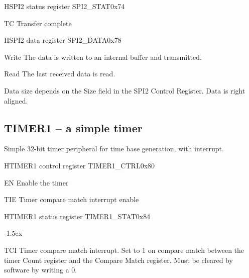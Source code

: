 \documentclass[12pt]{article}
\begin{document}
\begin{register}{H}{SPI2 status register SPI2\_STAT}{0x74}
\label{spi2stat}
%
%
\regnewline%
\end{register}
\begin{regdesc}[0.8\textwidth]\begin{reglist}[0000]
\item [TC] Transfer complete
\end{reglist}\end{regdesc}

\begin{register}{H}{SPI2 data register SPI2\_DATA}{0x78}
\label{spi2data}
\regnewline%
\end{register}
\begin{regdesc}[0.8\textwidth]\begin{reglist}[000000000]
\item[Write] The data is written to an internal buffer and transmitted.
\item[Read] The last received data is read.
\end{reglist}\end{regdesc}
Data size depends on the Size field in the SPI2 Control Register. Data is right aligned.


\subsection{TIMER1 -- a simple timer}
Simple 32-bit timer peripheral for time base generation, with interrupt.

\begin{register}{H}{TIMER1 control register TIMER1\_CTRL}{0x80}
\label{timer1ctrl}
%
%
%
\regnewline%
\end{register}
\begin{regdesc}[0.8\textwidth]\begin{reglist}[0000]
\item[EN] Enable the timer
\item[TIE] Timer compare match interrupt enable
\end{reglist}\end{regdesc}

\begin{register}{H}{TIMER1 status register TIMER1\_STAT}{0x84}
\label{timer1stat}
%
%
\regnewline%
\end{register}
\begin{regdesc}[0.8\textwidth]\begin{reglist}[0000]
\itemsep-1.5ex
\item[TCI] Timer compare match interrupt. Set to 1 on compare match between the timer Count register and the Compare Match register. Must be cleared by software by writing a 0.
\end{reglist}\end{regdesc}
\end{document}
